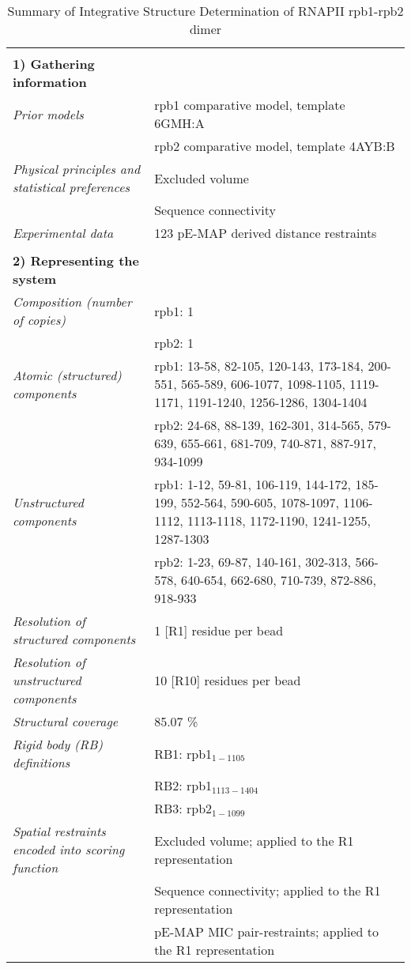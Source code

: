 \documentclass[8pt,a4paper]{article}
\begin{document}
\begin{longtable}{ p{} | p{} } 
\caption{Summary of Integrative Structure Determination of RNAPII rpb1-rpb2 dimer}
  
  &  \\
  \textbf{1) Gathering information} & \\
    \hline

            \textit{Prior models} & rpb1 comparative model, template 6GMH:A\\
            & rpb2 comparative model, template 4AYB:B \\
                \textit{Physical principles and statistical preferences} & Excluded volume\\
            & Sequence connectivity \\
                \textit{Experimental data} & 123 pE-MAP derived distance restraints\\
          
    &  \\
    \normalsize{\textbf{2) Representing the system}} & \\
    \hline
    
            \textit{Composition (number of copies)} & rpb1: 1\\
            & rpb2: 1 \\
                \textit{Atomic (structured) components} & rpb1: 13-58, 82-105, 120-143, 173-184, 200-551, 565-589, 606-1077, 1098-1105, 1119-1171, 1191-1240, 1256-1286, 1304-1404\\
            & rpb2: 24-68, 88-139, 162-301, 314-565, 579-639, 655-661, 681-709, 740-871, 887-917, 934-1099 \\
                \textit{Unstructured components} & rpb1: 1-12, 59-81, 106-119, 144-172, 185-199, 552-564, 590-605, 1078-1097, 1106-1112, 1113-1118, 1172-1190, 1241-1255, 1287-1303\\
            & rpb2: 1-23, 69-87, 140-161, 302-313, 566-578, 640-654, 662-680, 710-739, 872-886, 918-933 \\
                \textit{Resolution of structured components} & 1 [R1] residue per bead\\
                \textit{Resolution of unstructured components} & 10 [R10] residues per bead\\
                \textit{Structural coverage} & 85.07 \%\\
                \textit{Rigid body (RB) definitions} & RB1: rpb1$_{1-1105}$\\
            & RB2: rpb1$_{1113-1404}$ \\
            & RB3: rpb2$_{1-1099}$ \\
                \textit{Spatial restraints encoded into scoring function} & Excluded volume; applied to the R1 representation\\
            & Sequence connectivity; applied to the R1 representation \\
            & pE-MAP MIC pair-restraints; applied to the R1 representation \\
          



\end{longtable}
\end{document}

